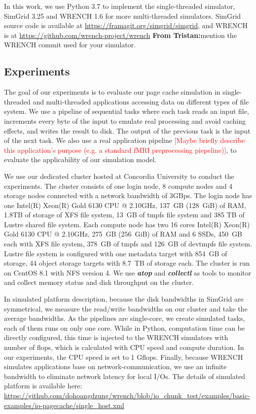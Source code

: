\documentclass[conference]{IEEEtran}
\newcommand{\tristan}[1]{\color{orange}\textbf{From Tristan:}#1\color{black}}
\begin{document}
			In this work, we use Python 3.7 to implement the single-threaded simulator, 
			SimGrid 3.25 and WRENCH 1.6 for more multi-threaded simulators. 
			SimGrid source code is available at \url{https://framagit.org/simgrid/simgrid}, 
			and WRENCH is at \url{https://github.com/wrench-project/wrench} \tristan{mention the WRENCH commit used for your simulator}.
			
		\subsection{Experiments}
		
        	The goal of our experiments is to evaluate our page cache 
			simulation in single-threaded and multi-threaded applications
			accessing data on different types of file system. We use a pipeline
			of sequential tasks where each task reads an input file, increments
			every byte of the input to emulate real processing and avoid caching
			effects, and writes the result to disk. The output of the previous
			task is the input of the next task. We also use a real application 
            pipeline \textcolor{red}{[Maybe briefly describe this application's purpose (e.g. a standard fMRI preprocessing piepeline)]}, to evaluate the applicability of our simulation model. 
			
			We use our dedicated cluster hosted at Concordia University to conduct 
			the experiments. The cluster consists of one login node, 8 compute nodes 
			and 4 storage nodes connected with a network bandwidth of 3GBps. 
			The login node has one Intel(R) Xeon(R) Gold 6130 CPU @ 2.10GHz, 
			137~GB (128~GiB) of RAM, 1.8TB of storage of XFS file system, 
			13~GB of tmpfs file system and 385 TB of Lustre shared file system. 
			Each compute node has two 16 cores Intel(R) Xeon(R) Gold 6130 CPU @ 2.10GHz, 
			275~GB (256~GiB) of RAM and 6 SSDs, 450~GB each with XFS file system, 
			378~GB of tmpfs and 126~GB of devtmpfs file system.
			Lustre file system is configured with one metadata target with 854~GB 
			of storage, 44 object storage targets with 8.7~TB of storage each. 
			The cluster is run on CentOS 8.1 with NFS version 4. 
			We use \textbf{\textit{atop}} and \textbf{\textit{collectl}} as tools to 
			monitor and collect memory status and disk throughput 
			on the cluster. 
			
			In simulated platform description, because the disk bandwidths in SimGrid 
			are symmetrical, we measure the read/write bandwidths on our cluster and 
			take the average bandwidths. 
			As the pipelines are single-core, we create simulated tasks, 
			each of them runs on only one core. 
			While in Python, computation time can be directly configured, 
			this time is injected to the WRENCH simulators with number of flops, 
			which is calculated with CPU speed and compute duration. 
			In our experiments, the CPU speed is set to 1 Gflops. 
			Finally, because WRENCH simulates applications base on network-communication, 
			we use an infinite bandwidth to eliminate network latency for local I/Os.
			The details of simulated platform is available here: 
			\url{https://github.com/dohoangdzung/wrench/blob/io_chunk_test/examples/basic-examples/io-pagecache/single_host.xml}
			
\end{document}

